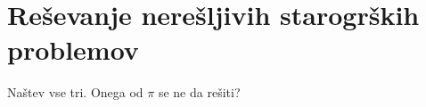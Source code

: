 \section{Reševanje nerešljivih starogrških problemov}

Naštev vse tri. Onega od $\pi$ se ne da rešiti?